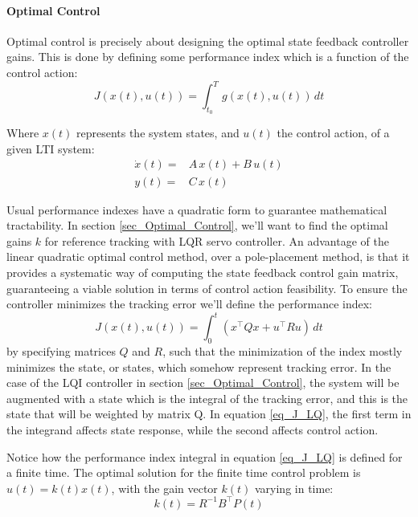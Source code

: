 \documentclass[  10pt, twoside]{report} %
\numberwithin{equation}{chapter}
\begin{document}

\paragraph{Optimal Control}
Optimal control is precisely about designing the optimal state feedback controller gains. This is done by defining some performance index which is a function of the control action:
\begin{equation}
    J \left( x(t) , u(t) \right) = \int_{t_0}^{T} g\left( x(t) , u(t) \right) \, dt
\end{equation}

Where $x(t)$ represents the system states, and $u(t)$ the control action, of a given LTI system:
\begin{align} %
    \dot{x}(t) =& A \, x(t) + B \, u(t) \\  %
    y(t)       =&   C \, x(t)
\end{align} 

Usual performance indexes have a quadratic form to guarantee mathematical tractability. In section \ref{sec_Optimal_Control}, we'll want to find the optimal gains $k$ for reference tracking with LQR servo controller. An advantage of the linear quadratic optimal control method, over a pole-placement method, is that it provides a systematic way of computing the state feedback control gain matrix, guaranteeing a viable solution in terms of control action feasibility. To ensure the controller minimizes the tracking error we'll define the performance index:
\begin{equation} \label{eq_J_LQ}
    J \left( x(t) , u(t) \right)=\int_{0}^{t} \left( x^\intercal Q x + u^\intercal R u \right) \,dt 
\end{equation} 
by specifying matrices $Q$ and $R$, such that the minimization of the index mostly minimizes the state, or states, which somehow represent tracking error. In the case of the LQI controller in section \ref{sec_Optimal_Control}, the system will be augmented with a state which is the integral of the tracking error, and this is the state that will be weighted by matrix Q. In equation \eqref{eq_J_LQ}, the first term in the integrand affects state response, while the second affects control action.

Notice how the performance index integral in equation \ref{eq_J_LQ} is defined for a finite time. The optimal solution for the finite time control problem is $u(t)= k(t) x(t)$, with the gain vector $k(t)$ varying in time:
\begin{equation}
    k(t) = R^{-1} B^\intercal P(t)
\end{equation}
\end{document}
